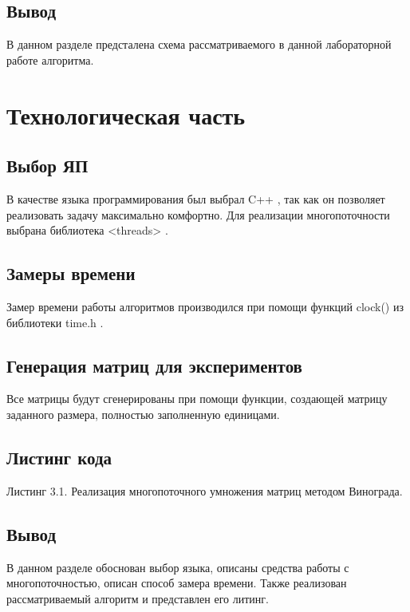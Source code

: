 \documentclass[12pt]{report}
\begin{document}
	\section*{Вывод}
	
	В данном разделе предсталена схема рассматриваемого в данной лабораторной работе алгоритма.
	
	\chapter{Технологическая часть}
	
	\section{Выбор ЯП}
	В качестве языка программирования был выбрал C++ \cite{2}, так как он позволяет реализовать задачу максимально комфортно.
	Для реализации многопоточности выбрана библиотека <threads> \cite{3}.
	
	\section{Замеры времени}
	Замер времени работы алгоритмов производился при помощи функций clock() из библиотеки time.h \cite{4}.
	
	\section{Генерация матриц для экспериментов}
	
	Все матрицы будут сгенерированы при помощи функции, создающей матрицу заданного размера, полностью заполненную единицами.
	
	\section{Листинг кода}
	
	\begin{center}
	Листинг 3.1. Реализация многопоточного умножения матриц методом Винограда.
	\end{center}
	
	
	\section*{Вывод}
	
	В данном разделе обоснован выбор языка, описаны средства работы с многопоточностью, описан способ замера времени. Также реализован рассматриваемый алгоритм и представлен его литинг.
	
\end{document}
